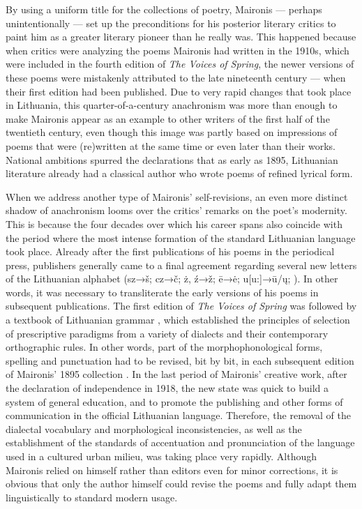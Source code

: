 \begin{paper}
By using a uniform title for the
collections of poetry, Maironis --- perhaps unintentionally --- set up 
the preconditions for his posterior literary critics to paint him as a greater literary pioneer than he
really was. This happened because when critics were analyzing the poems Maironis had written
in the 1910s, which were included in the fourth edition of \emph{The
Voices of Spring}, the newer versions of these poems were mistakenly attributed to the late
nineteenth century --- when their first edition had been published. Due to
very rapid changes that took place in Lithuania, this
quarter-of-a-century anachronism was more than enough to make Maironis
appear as an example to other writers of the first half of the twentieth
century, even though this image was partly based on impressions of poems that were (re)written at
the same time or even later than their works. National ambitions spurred
the declarations that as early as 1895, Lithuanian literature already
had a classical author who wrote poems of refined lyrical form.

When we address another type of
Maironis' self-revisions, an even more distinct shadow of anachronism looms over the critics'
remarks on the poet's modernity. This is because the four decades over which his career spans also coincide
with the period where the most intense formation of the standard Lithuanian
language took place. Already after the first publications of his poems in the
periodical press, publishers generally came to a final agreement
regarding several new letters of the Lithuanian alphabet (sz→š; cz→č; ż,
ź→ž; ē→ė; u{[}u:{]}→ū/ų; \citealt[38--39]{venckiene_bendrine_2006}). In other words, it was
necessary to transliterate the early versions of his
poems in subsequent publications. The first edition of \emph{The Voices
of Spring} was followed by a textbook of Lithuanian grammar \citep{jablonskis_lietuviskos_1901}, which established the principles of selection of prescriptive
paradigms from a variety of dialects and their contemporary orthographic
rules. In other words, part of the morphophonological forms, spelling and punctuation  had to be revised, bit by bit, in each subsequent edition of Maironis' 1895 collection \citep[204--05]{venckiene_jono_2012}. In the last period of Maironis' creative work, after the declaration of independence in 1918, the new state was quick to build a system of general education, and to promote the publishing and other forms of communication in the
official Lithuanian language. Therefore, the removal of
the dialectal vocabulary and morphological inconsistencies, as well as
the establishment of the standards of accentuation and pronunciation of
the language used in a cultured urban milieu, was taking place very
rapidly. Although Maironis relied on himself rather than editors even
for minor corrections, it is obvious that only the author himself could
revise the poems and fully adapt them linguistically to standard modern
usage.


\end{paper}

